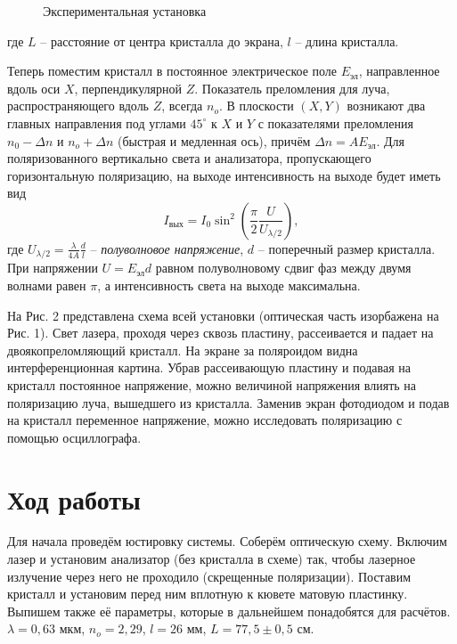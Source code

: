 \documentclass[a4paper,12pt]{article}
\begin{document}
\begin{figure}[h]
 \caption{\centering Экспериментальная установка}
	\label{fig:image1}
\end{figure}

где $L$ -- расстояние от центра кристалла до экрана, $l$ -- длина кристалла.

Теперь поместим кристалл в постоянное электрическое поле $E_{\text{эл}}$, направленное вдоль оси $X$, перпендикулярной $Z$. Показатель преломления для луча, распространяющего вдоль $Z$, всегда $n_o$. В плоскости $(X,Y)$ возникают два главных направления под углами $45^\circ$ к $X$ и $Y$ с показателями преломления $n_0 - \Delta n$ и $n_o + \Delta n$ (быстрая и медленная ось), причём $\Delta n = A E_{\text{эл}}$. Для поляризованного вертикально света и анализатора, пропускающего горизонтальную поляризацию, на выходе интенсивность на выходе будет иметь вид
\begin{equation}
I_{\text{вых}} = I_0 \sin^2 \left(\dfrac{\pi}{2} \dfrac{U}{U_{\lambda/2}} \right),
\end{equation}
где $\displaystyle U_{\lambda/2} = \frac{\lambda}{4A}\frac{d}{l}$ -- \textit{полуволновое напряжение}, $d$ -- поперечный размер кристалла.  При напряжении $U = E_{\text{эл}}d$ равном полуволновому сдвиг фаз между двумя волнами равен $\pi$, а интенсивность света на выходе максимальна. 


На Рис. 2 представлена схема всей установки (оптическая часть изорбажена на Рис. 1). Свет лазера, проходя через сквозь пластину, рассеивается и падает на двоякопреломляющий кристалл. На экране за поляроидом видна интерференционная картина. Убрав рассеивающую пластину и подавая на кристалл постоянное напряжение, можно величиной напряжения влиять на поляризацию луча, вышедшего из кристалла. Заменив экран фотодиодом и подав на кристалл переменное напряжение, можно исследовать поляризацию с помощью осциллографа.
\section{Ход работы}
Для начала проведём юстировку системы. Соберём оптическую схему. Включим лазер и установим анализатор (без кристалла в схеме) так, чтобы лазерное излучение через него не проходило (скрещенные поляризации). Поставим кристалл и установим перед ним вплотную к кювете матовую пластинку. Выпишем также её параметры, которые в дальнейшем понадобятся для расчётов. $\lambda = 0,63$ мкм, $n_o = 2,29$, $l = 26$ мм, $L = 77,5 \pm 0,5$ см.
\end{document}
